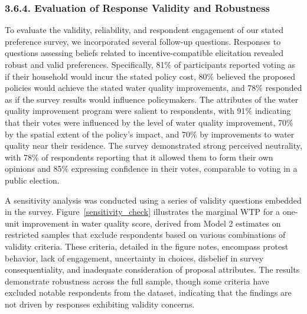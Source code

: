 \documentclass[12pt]{article}
\begin{document}


\restoregeometry %




\subsubsection*{3.6.4. Evaluation of Response Validity and Robustness}
    


To evaluate the validity, reliability, and respondent engagement of our stated preference survey, we incorporated several 
follow-up questions. Responses to questions assessing beliefs related to incentive-compatible elicitation revealed robust 
and valid preferences. Specifically, 81\% of participants reported voting as if their household would incur the stated policy 
cost, 80\% believed the proposed policies would achieve the stated water quality improvements, and 78\% responded as if the 
survey results would influence policymakers. The attributes of the water quality improvement program were salient to 
respondents, with 91\% indicating that their votes were influenced by the level of water quality improvement, 70\% by the 
spatial extent of the policy’s impact, and 70\% by improvements to water quality near their residence. The survey 
demonstrated strong perceived neutrality, with 78\% of respondents reporting that it allowed them to form their own 
opinions and 85\% expressing confidence in their votes, comparable to voting in a public election.

A sensitivity analysis was conducted using a series of validity questions embedded in the survey. Figure~\ref{sensitivity_check} illustrates the 
marginal WTP for a one-unit improvement in water quality score, derived from Model 2 estimates on restricted 
samples that exclude respondents based on various combinations of validity criteria. These criteria, detailed in the figure notes, encompass 
protest behavior, lack of engagement, uncertainty in choices, disbelief in survey consequentiality, and inadequate consideration of proposal 
attributes. The results demonstrate robustness across the full sample, though some criteria have excluded notable respondents from the dataset, 
indicating that the findings are not driven by responses exhibiting validity concerns.
\end{document}
